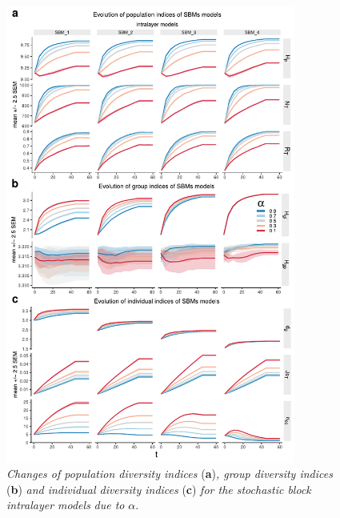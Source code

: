 \documentclass{svproc}
\begin{document}
\begin{figure}[!ht]
    \centering
    \includegraphics[width=0.85\textwidth]{FigS3.pdf}
    \caption{
    \textit{Changes of population diversity indices} (\textbf{a})\textit{, group diversity indices} (\textbf{b}) \textit{and individual diversity indices} (\textbf{c}) \textit{for the stochastic block intralayer models} \textit{due to} $\alpha$.
    }
    \label{supp:3}
\end{figure}
\end{document}
